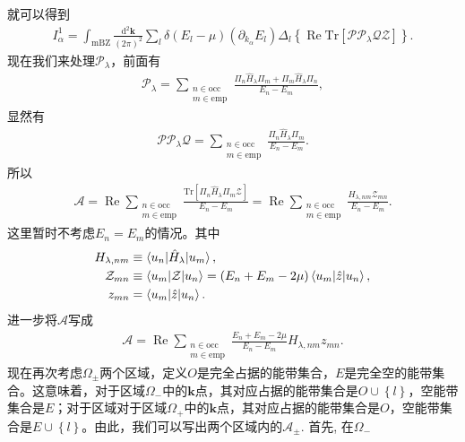 \documentclass[10pt, oneside]{article}
\begin{document}
就可以得到
\begin{align}
	I^{1}_{\alpha}  = \int_{\mathrm{mBZ}} \frac{\mathrm{d}^{2} \bm{k}}{\left(2 \pi\right)^{2}} \sum_{l} \delta \left( E_{l} - \mu\right) \left( \partial_{k_{\alpha}} E_{l} \right) \Delta_{l} \left\{\operatorname{Re} \mathrm{Tr} \left[\mathcal{P} \mathcal{P}_{\lambda} \mathcal{Q} \mathcal{Z} \right] \right\}.  
\end{align}
现在我们来处理\(\mathcal{P}_{\lambda}\)，前面有
\begin{align}
	\mathcal{P}_{\lambda} = \sum_{\substack{n \in \mathrm{occ} \\ m \in \mathrm{emp}}} \frac{\Pi_{n } \hat{H}_{\lambda} \Pi_{m } + \Pi_{m} \hat{H}_{\lambda} \Pi_{n}}{E_{n } - E_{m }},
\end{align}
显然有
\begin{align}
	\mathcal{P} \mathcal{P}_{\lambda} \mathcal{Q} = \sum_{\substack{n \in \mathrm{occ} \\ m \in \mathrm{emp}}} \frac{\Pi_{n } \hat{H}_{\lambda} \Pi_{m }}{E_{n } - E_{m }}.
\end{align}
所以
\begin{align}
	\mathcal{A} = \operatorname{Re} \sum_{\substack{n \in \mathrm{occ} \\ m \in \mathrm{emp}}} \frac{\mathrm{Tr} \left[\Pi_{n } \hat{H}_{\lambda} \Pi_{m } \mathcal{Z}\right]}{E_{n} - E_{m}} = \operatorname{Re} \sum_{\substack{n \in \mathrm{occ} \\ m \in \mathrm{emp}}} \frac{H_{\lambda,nm} \mathcal{Z}_{mn} }{E_{n } - E_{m }}.
\end{align}
这里暂时不考虑\(E_{n} = E_{m }\)的情况。其中
\begin{align}
	H_{\lambda, nm} & \equiv \braket{u_{n} | \hat{H}_{\lambda} | u_{m }}, \\
	\mathcal{Z}_{mn} & \equiv \braket{u_{m } | \mathcal{Z} | u_{n }} = \left(E_{n} + E_{m } - 2 \mu\right) \braket{u_{m } | \hat{z} | u_{n }} , \\
	z_{mn}& = \braket{u_{m } | \hat{z} | u_{n }} .
\end{align}
进一步将\(\mathcal{A}\)写成
\begin{align}
	\mathcal{A} = \operatorname{Re} \sum_{\substack{n \in \mathrm{occ} \\ m \in \mathrm{emp}}} \frac{E_{n} + E_{m } - 2 \mu}{E_{n } - E_{m }} H_{\lambda, nm} z_{mn}.
\end{align}
现在再次考虑\(\Omega_{\pm}\)两个区域，定义\(O\)是完全占据的能带集合，\(E\)是完全空的能带集合。这意味着，对于区域\(\Omega_{-}\)中的\(\bm{k}\)点，其对应占据的能带集合是\(O \cup \left\{l\right\}\)，空能带集合是\(E\)；对于区域对于区域\(\Omega_{+}\)中的\(\bm{k}\)点，其对应占据的能带集合是\(O\)，空能带集合是\(E \cup \left\{l\right\}\)。由此，我们可以写出两个区域内的\(\mathcal{A}_{\pm}\). 首先, 在\(\Omega_{-}\)
\end{document}
